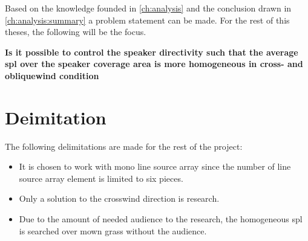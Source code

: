 Based on the knowledge founded in \autoref{ch:analysis} and the conclusion drawn in \autoref{ch:analysis:summary} a problem statement can be made. For the rest of this theses, the following will be the focus.


\textbf{Is it possible to control the speaker directivity such that the average \gls{spl} over the speaker coverage area is more homogeneous in cross- and obliquewind condition}



\section{Deimitation}
The following delimitations are made for the rest of the project:

\begin{itemize}
\item It is chosen to work with mono line source array since the number of line source array element is limited to six pieces.
\item Only a solution to the crosswind direction is research.
\item Due to the amount of needed audience to the research, the homogeneous \gls{spl} is searched over mown grass without the audience.
\end{itemize}